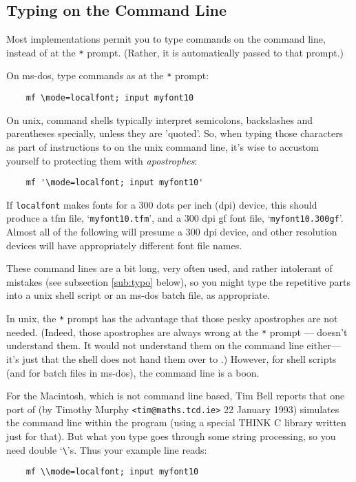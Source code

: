 \subsection{Typing on the Command Line}\label{sub:cmdline}

Most \MF{} implementations permit you to type \MF{} commands on the
command line, instead of at the {\tt **} prompt.  (Rather, it is
automatically passed to that prompt.)

On {\sc ms-dos}, type commands as at the {\tt **} prompt:
\begin{verbatim}
    mf \mode=localfont; input myfont10
\end{verbatim}

On {\sc unix}, command shells typically interpret semicolons,
backslashes and parentheses specially, unless they are 'quoted'.
So, when typing those characters as part of instructions to \MF{}
on the {\sc unix} command line, it's wise to accustom
yourself to protecting them with {\em apostrophes\/}:
\begin{verbatim}
    mf '\mode=localfont; input myfont10'
\end{verbatim}
If {\tt localfont} makes fonts for a 300 dots per inch (dpi) device,
this should produce a {\sc tfm} file, `{\tt myfont10.tfm}',
and a 300 dpi {\sc gf} font file, `{\tt myfont10.300gf}'.
Almost all of the following will presume a 300 dpi device, and other
resolution devices will have appropriately different font file names.

These command lines are a bit long, very often used, and rather
intolerant of mistakes (see subsection \ref{sub:typo} below),
so you might type the repetitive parts into a {\sc unix} shell script
or an {\sc ms-dos} batch file, as appropriate.

In {\sc unix}, the {\tt **} prompt has the advantage that those pesky
apostrophes are not needed.  (Indeed, those apostrophes are always
wrong at the {\tt **} prompt --- \MF{} doesn't understand them.
It would not understand them on the command line either---it's just
that the shell does not hand them over to \MF{}.)
However, for shell scripts (and for batch files in {\sc ms-dos}),
the command line is a boon.

For the Macintosh, which is not command line based,
Tim {\sc Bell} reports that one port of \MF{}
(by Timothy {\sc Murphy\/} {\tt <tim@maths.tcd.ie>} 22 January 1993)
simulates the command line within the program
(using a special THINK C library written just for that).
But what you type goes through some string processing,
so you need double `\verb+\+'s.
Thus your example line reads:
\begin{verbatim}
    mf \\mode=localfont; input myfont10
\end{verbatim}


